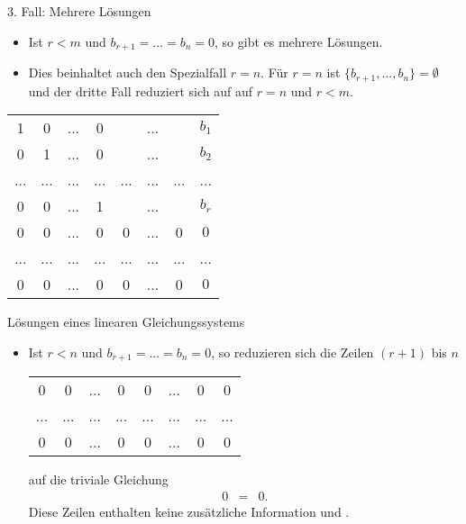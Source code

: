 \documentclass[german]{beamer}
\newcommand{\bq}{\begin{eqnarray*}}
\newcommand{\eq}{\end{eqnarray*}}
\newcommand{\superalert}[1]{{\color{MyYellowOrange}{#1}}}
\begin{document}
\begin{frame}{3. Fall: Mehrere L\"osungen}

\begin{itemize}
\item Ist $r<m$ und $b_{r+1}=...=b_n=0$, so gibt es mehrere L\"osungen.
\item Dies beinhaltet auch den Spezialfall $r=n$. F\"ur $r=n$ ist
$\{b_{r+1},...,b_n\}=\emptyset$ und der dritte Fall reduziert sich auf auf $r=n$ und $r<m$.
\end{itemize}
\begin{center}
\begin{tabular}{ccccccc|c}
1 & 0 & ... & 0 & \superalert{$a_{1(r+1)}$} & ... & \superalert{$a_{1m}$} & $b_1$ \\
0 & 1 & ... & 0 & \superalert{$a_{2(r+1)}$} & ... & \superalert{$a_{2m}$} & $b_2$ \\
... & ... & ... & ... & ... & ... & ... & ... \\
0 & 0 & ... & 1 & \superalert{$a_{r(r+1)}$} & ... & \superalert{$a_{rm}$} & $b_r$ \\
0 & 0 & ... & 0 & 0 & ... & 0 & $0$ \\
... & ... & ... & ... & ... & ... & ... & ... \\
0 & 0 & ... & 0 & 0 & ... & 0 & $0$ \\
\end{tabular}
\end{center}

\end{frame}

\begin{frame}{L\"osungen eines linearen Gleichungssystems}

\begin{itemize}
\item Ist $r<n$ und $b_{r+1}=...=b_n=0$, so reduzieren sich die Zeilen $(r+1)$ bis $n$ 
\begin{center}
\begin{tabular}{ccccccc|c}
0 & 0 & ... & 0 & 0 & ... & 0 & 0 \\
... & ... & ... & ... & ... & ... & ... & ... \\
0 & 0 & ... & 0 & 0 & ... & 0 & 0 \\
\end{tabular}
\end{center}
auf die triviale
Gleichung 
\bq
 0 & = & 0.
\eq
Diese Zeilen enthalten keine zus\"atzliche Information und \superalert{k\"onnen auch weggelassen werden}.
\end{itemize}

\end{frame}
\end{document}
